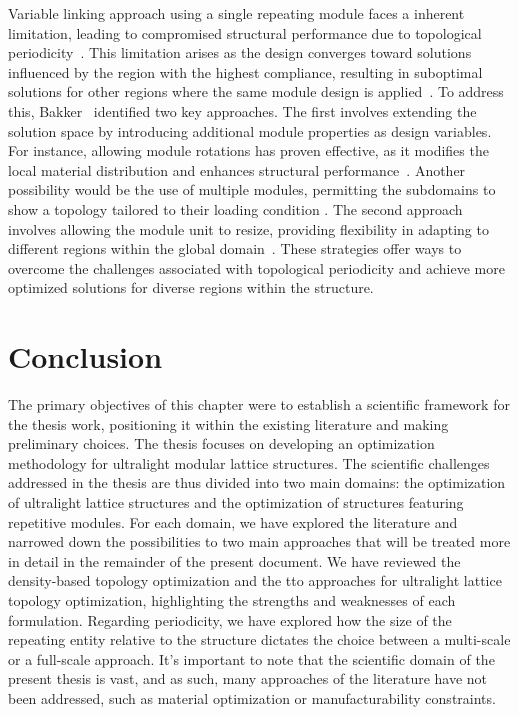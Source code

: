 Variable linking approach using a single repeating module faces a inherent limitation, leading to compromised structural performance due to topological periodicity~. This limitation arises as the design converges toward solutions influenced by the region with the highest compliance, resulting in suboptimal solutions for other regions where the same module design is applied~. To address this, Bakker~ identified two key approaches. The first involves extending the solution space by introducing additional module properties as design variables. For instance, allowing module rotations has proven effective, as it modifies the local material distribution and enhances structural performance~. Another possibility would be the use of multiple modules, permitting the subdomains to show a topology tailored to their loading condition . The second approach involves allowing the module unit to resize, providing flexibility in adapting to different regions within the global domain~. These strategies offer ways to overcome the challenges associated with topological periodicity and achieve more optimized solutions for diverse regions within the structure.

\section{Conclusion}
The primary objectives of this chapter were to establish a scientific framework for the thesis work, positioning it within the existing literature and making preliminary choices. The thesis focuses on developing an optimization methodology for ultralight modular lattice structures. The scientific challenges addressed in the thesis are thus divided into two main domains: the optimization of ultralight lattice structures and the optimization of structures featuring repetitive modules. For each domain, we have explored the literature and narrowed down the possibilities to two main approaches that will be treated more in detail in the remainder of the present document. We have reviewed the density-based topology optimization and the \gls{tto} approaches for ultralight lattice topology optimization, highlighting the strengths and weaknesses of each formulation. Regarding periodicity, we have explored how the size of the repeating entity relative to the structure dictates the choice between a multi-scale or a full-scale approach. It's important to note that the scientific domain of the present thesis is vast, and as such, many approaches of the literature have not been addressed, such as material optimization or manufacturability constraints.